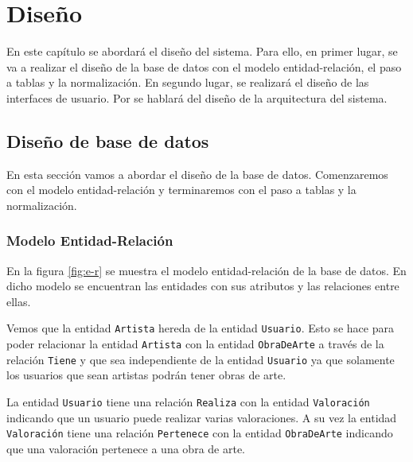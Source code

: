 \chapter{Diseño}
En este capítulo se abordará el diseño del sistema. Para ello, en primer
lugar, se va a realizar el diseño de la base de datos con el modelo
entidad-relación, el paso a tablas y la normalización. En segundo lugar,
se realizará el diseño de las interfaces de usuario. Por se hablará del
diseño de la arquitectura del sistema.

\section{Diseño de base de datos}
En esta sección vamos a abordar el diseño de la base de datos.
Comenzaremos con el modelo entidad-relación y terminaremos con el paso a
tablas y la normalización.

\subsection{Modelo Entidad-Relación}
En la figura \ref{fig:e-r} se muestra el modelo entidad-relación de la base de
datos. En dicho modelo se encuentran las entidades con sus atributos y las
relaciones entre ellas.

Vemos que la entidad \texttt{Artista} hereda de la entidad \texttt{Usuario}.
Esto se hace para poder relacionar la entidad \texttt{Artista} con la entidad
\texttt{ObraDeArte} a través de la relación \texttt{Tiene} y que sea independiente
de la entidad \texttt{Usuario} ya que solamente los usuarios que sean artistas
podrán tener obras de arte.

La entidad \texttt{Usuario} tiene una relación \texttt{Realiza} con la entidad
\texttt{Valoración} indicando que un usuario puede realizar varias valoraciones.
A su vez la entidad \texttt{Valoración} tiene una relación \texttt{Pertenece} con
la entidad \texttt{ObraDeArte} indicando que una valoración pertenece a una obra
de arte.

